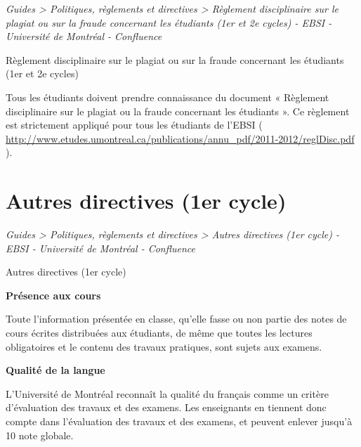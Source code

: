 \documentclass [12 pt]{article}
\begin{document}
        
        
        \textit{
        Guides > Politiques, règlements et directives > Règlement disciplinaire sur le
            plagiat ou sur la fraude concernant les étudiants (1er et 2e cycles) - EBSI - Université
            de Montréal - Confluence
        }
    
        Règlement disciplinaire sur le plagiat ou sur la fraude concernant les étudiants (1er
            et 2e cycles)
        
            Tous les étudiants doivent prendre connaissance du document « Règlement disciplinaire
                sur le plagiat ou la fraude concernant les étudiants ». Ce règlement est strictement
                appliqué pour tous les étudiants de l'EBSI (
        \href{
        http://www.etudes.umontreal.ca/publications/annu_pdf/2011-2012/reglDisc.pdf
        } {
        http://www.etudes.umontreal.ca/publications/annu_pdf/2011-2012/reglDisc.pdf
        }
    ).
        
    
    
        \newpage
        \section {
        Autres directives (1er cycle)
        }
        
        
        
        \textit{
        Guides > Politiques, règlements et directives > Autres directives (1er cycle) -
            EBSI - Université de Montréal - Confluence
        }
    
        Autres directives (1er cycle)
        
            
        \textbf{
        Présence aux cours
        }
    
            Toute l'information présentée en classe, qu'elle fasse ou non partie des notes de
                cours écrites distribuées aux étudiants, de même que toutes les lectures
                obligatoires et le contenu des travaux pratiques, sont sujets aux examens.
            
        \textbf{
        Qualité de la langue
        }
    
            L'Université de Montréal reconnaît la qualité du français comme un critère
                d'évaluation des travaux et des examens. Les enseignants en tiennent donc compte
                dans l'évaluation des travaux et des examens, et peuvent enlever jusqu'à 10 %
                note globale.
            
\end{document}
